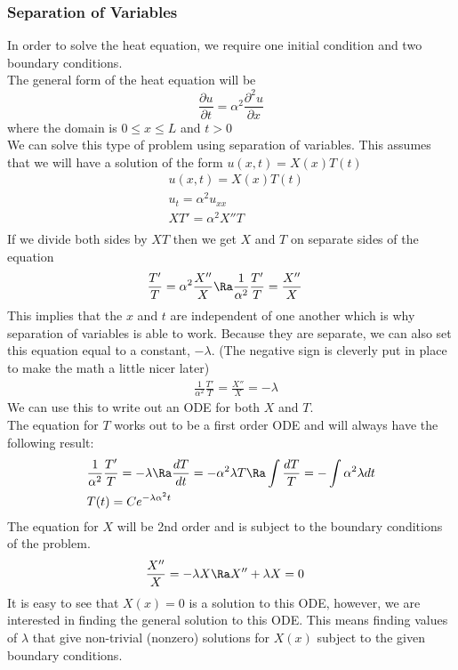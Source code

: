 \subsubsection{Separation of Variables}
In order to solve the heat equation, we require one initial condition and two boundary conditions.\\
The general form of the heat equation will be
$$\frac{\partial u}{\partial t}=\alpha^2\frac{\partial^2u}{\partial x}$$
where the domain is $0\leq x\leq L$ and $t>0$\\
We can solve this type of problem using separation of variables. This assumes that we will have a solution of the form $u(x,t)=X(x)T(t)$
\begin{align*}
    &u(x,t)=X(x)T(t)\\
    &u_t=\alpha^2 u_{xx}\\
    &XT'=\alpha^2X''T\\
\end{align*}
If we divide both sides by $XT$ then we get $X$ and $T$ on separate sides of the equation
\begin{align*}
    &\frac{T'}{T}=\alpha^2\frac{X''}{X}\Ra \frac{1}{\alpha^2}\frac{T'}{T}=\frac{X''}{X}
\end{align*}
This implies that the $x$ and $t$ are independent of one another which is why separation of variables is able to work. Because they are separate, we can also set this equation equal to a constant, $-\lambda$. (The negative sign is cleverly put in place to make the math a little nicer later)
\begin{align*}
    &\frac{1}{\alpha^2}\frac{T'}{T}=\frac{X''}{X}=-\lambda
\end{align*}
We can use this to write out an ODE for both $X$ and $T$.\\
The equation for $T$ works out to be a first order ODE and will always have the following result:
\begin{align*}
    &\frac{1}{\alpha^2}\frac{T'}{T}=-\lambda\Ra \frac{dT}{dt}=-\alpha^2\lambda T\Ra \int \frac{dT}{T}=-\int\alpha^2\lambda dt\\
    &T(t)=Ce^{-\lambda\alpha^2t}
\end{align*}
The equation for $X$ will be 2nd order and is subject to the boundary conditions of the problem.
\begin{align*}
    &\frac{X''}{X}=-\lambda X\Ra X''+\lambda X=0
\end{align*}
It is easy to see that $X(x)=0$ is a solution to this ODE, however, we are interested in finding the general solution to this ODE. This means finding values of $\lambda$ that give non-trivial (nonzero) solutions for $X(x)$ subject to the given boundary conditions.\\
